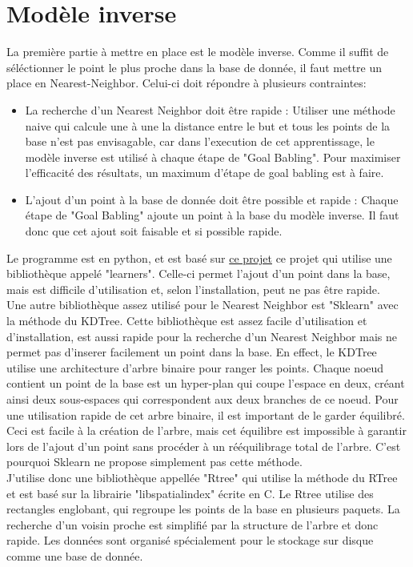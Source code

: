 \documentclass{article}
\begin{document}
\section*{Modèle inverse}

La première partie à mettre en place est le modèle inverse. Comme il suffit de séléctionner le point le plus proche dans la base de donnée, il faut mettre un place en Nearest-Neighbor. Celui-ci doit répondre à plusieurs contraintes:
\begin{itemize}
    \item La recherche d'un Nearest Neighbor doit être rapide : Utiliser une méthode naive qui calcule une à une la distance entre le but et tous les points de la base n'est pas envisagable, car dans l'execution de cet apprentissage, le modèle inverse est utilisé à chaque étape de "Goal Babling". Pour maximiser l'efficacité des résultats, un maximum d'étape de goal babling est à faire.
    \item L'ajout d'un point à la base de donnée doit être possible et rapide : Chaque étape de "Goal Babling" ajoute un point à la base du modèle inverse. Il faut donc que cet ajout soit faisable et si possible rapide.
\end{itemize}
Le programme est en python, et est basé sur \href{http://www.fabien.benureau.com/recode/benureau2015_gb/benureau2015_gb.html}{ce projet} ce projet qui utilise une bibliothèque appelé "learners". Celle-ci permet l'ajout d'un point dans la base, mais est difficile d'utilisation et, selon l'installation, peut ne pas être rapide.\\
Une autre bibliothèque assez utilisé pour le Nearest Neighbor est "Sklearn" avec la méthode du KDTree. Cette bibliothèque est assez facile d'utilisation et d'installation, est aussi rapide pour la recherche d'un Nearest Neighbor mais ne permet pas d'inserer facilement un point dans la base. En effect, le KDTree utilise une architecture d'arbre binaire pour ranger les points. Chaque noeud contient un point de la base est un hyper-plan qui coupe l'espace en deux, créant ainsi deux sous-espaces qui correspondent aux deux branches de ce noeud. Pour une utilisation rapide de cet arbre binaire, il est important de le garder équilibré. Ceci est facile à la création de l'arbre, mais cet équilibre est impossible à garantir lors de l'ajout d'un point sans procéder à un rééquilibrage total de l'arbre. C'est pourquoi Sklearn ne propose simplement pas cette méthode.\\
J'utilise donc une bibliothèque appellée "Rtree" qui utilise la méthode du RTree et est basé sur la librairie "libspatialindex" écrite en C. Le Rtree utilise des rectangles englobant, qui regroupe les points de la base en plusieurs paquets. La recherche d'un voisin proche est simplifié par la structure de l'arbre et donc rapide. Les données sont organisé spécialement pour le stockage sur disque comme une base de donnée.
\end{document}
